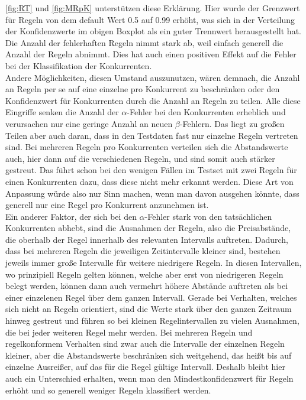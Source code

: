 \autoref{fig:RT} und \autoref{fig:MRpK} unterstützen diese Erklärung. Hier wurde der Grenzwert für Regeln von dem default Wert 0.5 auf 0.99 erhöht, was sich in der Verteilung der Konfidenzwerte im obigen Boxplot als ein guter Trennwert herausgestellt hat. Die Anzahl der fehlerhaften Regeln nimmt stark ab, weil einfach generell die Anzahl der Regeln abnimmt. Dies hat auch einen positiven Effekt auf die Fehler bei der Klassifikation der Konkurrenten.\\
Andere Möglichkeiten, diesen Umstand auszunutzen, wären demnach, die Anzahl an Regeln per se auf eine einzelne pro Konkurrent zu beschränken oder den Konfidenzwert für Konkurrenten durch die Anzahl an Regeln zu teilen. Alle diese Eingriffe senken die Anzahl der $\alpha$-Fehler bei den Konkurrenten erheblich und verursachen nur eine geringe Anzahl an neuen $\beta$-Fehlern. Das liegt zu großen Teilen aber auch daran, dass in den Testdaten fast nur einzelne Regeln vertreten sind. Bei mehreren Regeln pro Konkurrenten verteilen sich die Abstandswerte auch, hier dann auf die verschiedenen Regeln, und sind somit auch stärker gestreut. Das führt schon bei den wenigen Fällen im Testset mit zwei Regeln für einen Konkurrenten dazu, dass diese nicht mehr erkannt werden. Diese Art von Anpassung würde also nur Sinn machen, wenn man davon ausgehen könnte, dass generell nur eine Regel pro Konkurrent anzunehmen ist.\\
Ein anderer Faktor, der sich bei den $\alpha$-Fehler stark von den tatsächlichen Konkurrenten abhebt, sind die Ausnahmen der Regeln, also die Preisabstände, die oberhalb der Regel innerhalb des relevanten Intervalls auftreten. Dadurch, dass bei mehreren Regeln die jeweiligen Zeitintervalle kleiner sind, bestehen jeweils immer große Intervalle für weitere niedrigere Regeln. In diesen Intervallen, wo prinzipiell Regeln gelten können, welche aber erst von niedrigeren Regeln belegt werden, können dann auch vermehrt höhere Abstände auftreten als bei einer einzelenen Regel über dem ganzen Intervall. Gerade bei Verhalten, welches sich nicht an Regeln orientiert, sind die Werte stark über den ganzen Zeitraum hinweg gestreut und führen so bei kleinen Regelintervallen zu vielen Ausnahmen, die bei jeder weiteren Regel mehr werden. Bei mehreren Regeln und regelkonformem Verhalten sind zwar auch die Intervalle der einzelnen Regeln kleiner, aber die Abstandswerte beschränken sich weitgehend, das heißt bis auf einzelne Ausreißer, auf das für die Regel gültige Intervall. Deshalb bleibt hier auch ein Unterschied erhalten, wenn man den Mindestkonfidenzwert für Regeln erhöht und so generell weniger Regeln klassifiert werden.\\

